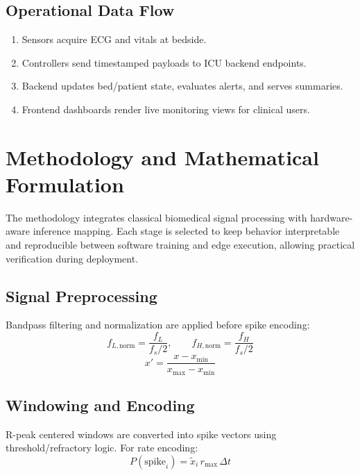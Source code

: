 \documentclass[12pt,a4paper]{article}
\begin{document}
\subsection{Operational Data Flow}

\begin{enumerate}[itemsep=0.25em]
  \item Sensors acquire ECG and vitals at bedside.
  \item Controllers send timestamped payloads to ICU backend endpoints.
  \item Backend updates bed/patient state, evaluates alerts, and serves summaries.
  \item Frontend dashboards render live monitoring views for clinical users.
\end{enumerate}

\section{Methodology and Mathematical Formulation}

The methodology integrates classical biomedical signal processing with hardware-aware inference mapping. Each stage is selected to keep behavior interpretable and reproducible between software training and edge execution, allowing practical verification during deployment.

\subsection{Signal Preprocessing}

Bandpass filtering and normalization are applied before spike encoding:
\begin{equation}
f_{L,\text{norm}}=\frac{f_L}{f_s/2}, \qquad f_{H,\text{norm}}=\frac{f_H}{f_s/2}
\end{equation}
\begin{equation}
x'=\frac{x-x_{\min}}{x_{\max}-x_{\min}}
\end{equation}

\subsection{Windowing and Encoding}

R-peak centered windows are converted into spike vectors using threshold/refractory logic. For rate encoding:
\begin{equation}
P(\text{spike}_i)=\tilde{x}_i \, r_{\max} \, \Delta t
\end{equation}
\end{document}
